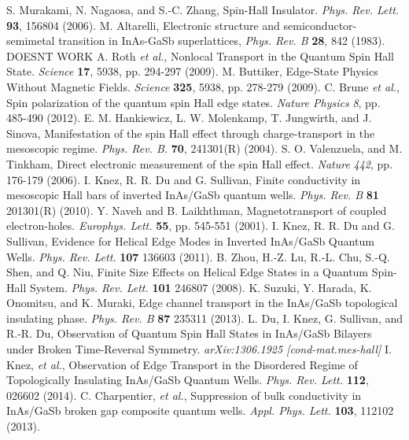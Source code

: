 \documentclass[titlepage,a4paper]{book}
\begin{document}
\begin{thebibliography}{199}
S. Murakami, N. Nagaosa, and S.-C. Zhang, Spin-Hall Insulator. \textit{Phys. Rev. Lett.} \textbf{93}, 156804 (2006).
M. Altarelli, Electronic structure and semiconductor-semimetal transition in InAs-GaSb superlattices, \textit{Phys. Rev. B} \textbf{28}, 842 (1983).
DOESNT WORK
A. Roth  \textit{et al.}, Nonlocal Transport in the Quantum Spin Hall State. \textit{Science} \textbf{17}, 5938, pp. 294-297 (2009).
M. Buttiker, Edge-State Physics Without Magnetic Fields. \textit{Science} \textbf{325}, 5938, pp. 278-279 (2009).
C. Brune \textit{et al.}, Spin polarization of the quantum spin Hall edge states. \textit{Nature Physics} \textit{8}, pp. 485-490 (2012).
E. M. Hankiewicz, L. W. Molenkamp, T. Jungwirth, and J. Sinova, Manifestation of the spin Hall effect through charge-transport in the mesoscopic regime. \textit{Phys. Rev. B.} \textbf{70}, 241301(R) (2004).  
S. O. Valenzuela, and M. Tinkham, Direct electronic measurement of the spin Hall effect. \textit{Nature} \textit{442}, pp. 176-179 (2006).
I. Knez, R. R. Du and G. Sullivan, Finite conductivity in mesoscopic Hall bars of inverted InAs/GaSb quantum wells. \textit{Phys. Rev. B} \textbf{81} 201301(R) (2010).
Y. Naveh and B. Laikhthman, Magnetotransport of coupled electron-holes. \textit{Europhys. Lett.} \textbf{55}, pp. 545-551 (2001).
I. Knez, R. R. Du and G. Sullivan, Evidence for Helical Edge Modes in Inverted InAs/GaSb Quantum Wells. \textit{Phys. Rev. Lett.} \textbf{107} 136603 (2011).
B. Zhou, H.-Z. Lu, R.-L. Chu, S.-Q. Shen, and Q. Niu, Finite Size Effects on Helical Edge States in a Quantum Spin-Hall System. \textit{Phys. Rev. Lett.} \textbf{101} 246807 (2008).
K. Suzuki, Y. Harada, K. Onomitsu, and K. Muraki, Edge channel transport in the InAs/GaSb topological insulating phase. \textit{Phys. Rev. B} \textbf{87}  235311 (2013).
L. Du, I. Knez, G. Sullivan, and R.-R. Du, Observation of Quantum Spin Hall States in InAs/GaSb Bilayers under Broken Time-Reversal Symmetry. \textit{arXiv:1306.1925 [cond-mat.mes-hall]}
 I. Knez, \textit{et al.}, Observation of Edge Transport in the Disordered Regime of Topologically Insulating InAs/GaSb Quantum Wells. \textit{Phys. Rev. Lett.} \textbf{112}, 026602 (2014).
C. Charpentier, \textit{et al.}, Suppression of bulk conductivity in InAs/GaSb broken gap composite quantum wells. \textit{Appl. Phys. Lett.} \textbf{103}, 112102 (2013).

\end{thebibliography}
\end{document}
